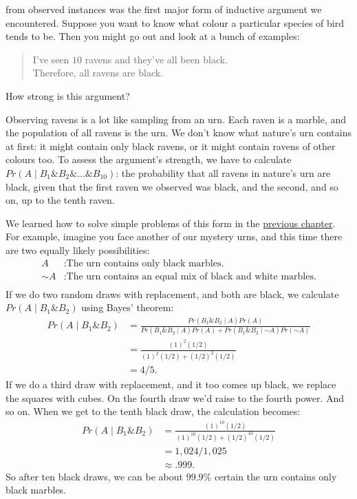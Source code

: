 \documentclass[justified]{tufte-book}
\newcommand{\given}{\mid}
\renewcommand{\neg}{\mathbin{\sim}}
\renewcommand{\wedge}{\mathbin{\&}}
\newcommand{\p}{Pr}
\newenvironment{argument}{\begin{quote}\normalsize}{\end{quote}}
\theoremstyle{definition}
\theoremstyle{definition}
\theoremstyle{definition}
\theoremstyle{remark}
\begin{document}
 from observed instances was the first major
form of inductive argument we encountered. Suppose you want to know what
colour a particular species of bird tends to be. Then you might go out
and look at a bunch of examples:

\begin{argument}
I've seen \(10\) ravens and they've all been black.\\
Therefore, all ravens are black.
\end{argument}

How strong is this argument?

Observing ravens is a lot like sampling from an urn. Each raven is a
marble, and the population of all ravens is the urn. We don't know what
nature's urn contains at first: it might contain only black ravens, or
it might contain ravens of other colours too. To assess the argument's
strength, we have to calculate
\(\p(A \given B_1 \wedge B_2 \wedge \ldots \wedge B_{10})\): the
probability that all ravens in nature's urn are black, given that the
first raven we observed was black, and the second, and so on, up to the
tenth raven.

We learned how to solve simple problems of this form in the
\protect\hyperlink{multiple-draws}{previous chapter}. For example,
imagine you face another of our mystery urns, and this time there are
two equally likely possibilities: \[
  \begin{aligned}
    A      &: \mbox{The urn contains only black marbles.} \\
    \neg A &: \mbox{The urn contains an equal mix of black and white marbles.} \\
  \end{aligned}
\] If we do two random draws with replacement, and both are black, we
calculate \(\p(A \given B_1 \wedge B_2)\) using Bayes' theorem: \[
  \begin{aligned}
    \p(A \given B_1 \wedge B_2) &= \frac{\p(B_1 \wedge B_2 \given A)\p(A)}{\p(B_1 \wedge B_2 \given A) \p(A) + \p(B_1 \wedge B_2 \given \neg A) \p(\neg A)} \\ 
    &= \frac{(1)^2(1/2)}{(1)^2(1/2) + (1/2)^2(1/2)}\\
    &= 4/5.
  \end{aligned}
\] If we do a third draw with replacement, and it too comes up black, we
replace the squares with cubes. On the fourth draw we'd raise to the
fourth power. And so on. When we get to the tenth black draw, the
calculation becomes: \[
  \begin{aligned}
    \p(A \given B_1 \wedge B_2) &= \frac{(1)^{10}(1/2)}{(1)^{10}(1/2) + (1/2)^{10}(1/2)}\\
    &= 1,024/1,025\\
    &\approx .999.
  \end{aligned}
\] So after ten black draws, we can be about \(99.9\%\) certain the urn
contains only black marbles.
\end{document}
